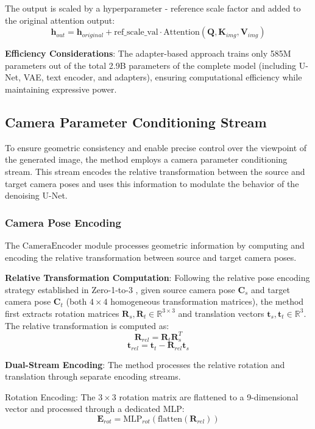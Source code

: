 The output is scaled by a hyperparameter - reference scale factor and added to the original attention output:
\[ \mathbf{h}_{out} = \mathbf{h}_{original} + \text{ref\_scale\_val} \cdot \text{Attention}(\mathbf{Q}, \mathbf{K}_{img}, \mathbf{V}_{img}) \]

\textbf{Efficiency Considerations}: The adapter-based approach trains only 585M parameters out of the total 2.9B parameters of the complete model (including U-Net, VAE, text encoder, and adapters), ensuring computational efficiency while maintaining expressive power.

\subsection{Camera Parameter Conditioning Stream}
To ensure geometric consistency and enable precise control over the viewpoint of the generated image, the method employs a camera parameter conditioning stream. This stream encodes the relative transformation between the source and target camera poses and uses this information to modulate the behavior of the denoising U-Net.

\subsubsection{Camera Pose Encoding}
The $\text{CameraEncoder}$ module processes geometric information by computing and encoding the relative transformation between source and target camera poses.

\textbf{Relative Transformation Computation}: Following the relative pose encoding strategy established in Zero-1-to-3 \cite{zero1to3}, given source camera pose $\mathbf{C}_s$ and target camera pose $\mathbf{C}_t$ (both $4 \times 4$ homogeneous transformation matrices), the method first extracts rotation matrices $\mathbf{R}_s, \mathbf{R}_t \in \mathbb{R}^{3 \times 3}$ and translation vectors $\mathbf{t}_s, \mathbf{t}_t \in \mathbb{R}^3$. The relative transformation is computed as:
\[ \mathbf{R}_{rel} = \mathbf{R}_t \mathbf{R}_s^T \]
\[ \mathbf{t}_{rel} = \mathbf{t}_t - \mathbf{R}_{rel} \mathbf{t}_s \]

\textbf{Dual-Stream Encoding}: The method processes the relative rotation and translation through separate encoding streams.

Rotation Encoding: The $3 \times 3$ rotation matrix are flattened to a 9-dimensional vector and processed through a dedicated MLP:
\[ \mathbf{E}_{rot} = \text{MLP}_{rot}(\text{flatten}(\mathbf{R}_{rel})) \]

